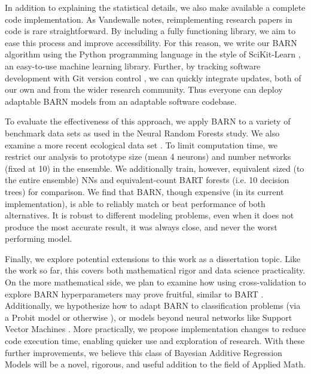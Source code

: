 \documentclass[12pt]{article}
\begin{document}
In addition to explaining the statistical details, we also make available a complete code implementation.  As Vandewalle \cite{vandewalle2012code} notes, reimplementing research papers in code is rare straightforward.  By including a fully functioning library, we aim to ease this process and improve accessibility.  For this reason, we write our BARN algorithm using the Python programming language \cite{van1995python} in the style of SciKit-Learn \cite{scikit-learn}, an easy-to-use machine learning library.  Further, by tracking software development with Git version control \cite{chacon2014pro}, we can quickly integrate updates, both of our own and from the wider research community.  Thus everyone can deploy adaptable BARN models from an adaptable software codebase.

To evaluate the effectiveness of this approach, we apply BARN to a variety of benchmark data sets \cite{Dua:2019} as used in the Neural Random Forests \cite{biau2019neural} study.  We also examine a more recent ecological data set \cite{roman2022bayclump}.  To limit computation time, we restrict our analysis to prototype size (mean 4 neurons) and number networks (fixed at 10) in the ensemble.  We additionally train, however, equivalent sized (to the entire ensemble) NNs and equivalent-count BART forests (i.e. 10 decision trees) for comparison.  We find that BARN, though expensive (in its current implementation), is able to reliably match or beat performance of both alternatives.  It is robust to different modeling problems, even when it does not produce the most accurate result, it was always close, and never the worst performing model.

Finally, we explore potential extensions to this work as a dissertation topic.  Like the work so far, this covers both mathematical rigor and data science practicality.  On the more mathematical side, we plan to examine how using cross-validation to explore BARN hyperparameters may prove fruitful, similar to BART \cite{chipman2010bart}.  Additionally, we hypothesize how to adapt BARN to classification problems (via a Probit model or otherwise \cite{mccullagh1989generalized}), or models beyond neural networks like Support Vector Machines \cite{hastie2009elements}.  More practically, we propose implementation changes to reduce code execution time, enabling quicker use and exploration of research.  With these further improvements, we believe this class of Bayesian Additive Regression Models will be a novel, rigorous, and useful addition to the field of Applied Math.
\end{document}
